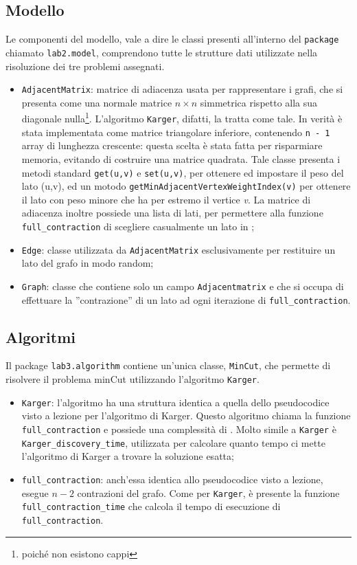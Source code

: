 \subsection{Modello}
Le componenti del modello, vale a dire le classi presenti all'interno del \texttt{package} chiamato \texttt{lab2.model}, comprendono tutte le strutture dati utilizzate nella risoluzione dei tre problemi assegnati. 
\begin{itemize}
	\item \label{adjmat}\texttt{AdjacentMatrix}: matrice di adiacenza usata per rappresentare i grafi, che si presenta come una normale matrice $n\times n$ simmetrica rispetto alla sua diagonale nulla\footnote{poiché non esistono cappi}. L'algoritmo \texttt{Karger}, difatti, la tratta come tale. In verità è stata implementata come matrice triangolare inferiore, contenendo \texttt{n - 1} array di lunghezza crescente: questa scelta è stata fatta per risparmiare memoria, evitando di costruire una matrice quadrata. Tale classe presenta i metodi standard \texttt{get(u,v)} e \texttt{set(u,v)}, per ottenere ed impostare il peso del lato (u,v), ed un motodo \texttt{getMinAdjacentVertexWeightIndex(v)} per ottenere il lato con peso minore che ha per estremo il vertice \textit{v}. La matrice di adiacenza inoltre possiede una lista di lati, per permettere alla funzione \texttt{full\_contraction} di scegliere casualmente un lato in ;
	\item \texttt{Edge}: classe utilizzata da \texttt{AdjacentMatrix} esclusivamente per restituire un lato del grafo in modo random;
	\item \texttt{Graph}: classe che contiene solo un campo \texttt{Adjacentmatrix} e che si occupa di effettuare la ''contrazione'' di un lato ad ogni iterazione di \texttt{full\_contraction}.
\end{itemize} 

\subsection{Algoritmi}
Il package \texttt{lab3.algorithm} contiene un'unica classe, \texttt{MinCut}, che permette di risolvere il problema minCut utilizzando l'algoritmo \texttt{Karger}.
\begin{itemize}
	\item \texttt{Karger}: l'algoritmo ha una struttura identica a quella dello pseudocodice visto a lezione per l'algoritmo di Karger. Questo algoritmo chiama la funzione \texttt{full\_contraction} e possiede una complessità di . Molto simile a \texttt{Karger} è \texttt{Karger\_discovery\_time}, utilizzata per calcolare quanto tempo ci mette l'algoritmo di Karger a trovare la soluzione esatta;
	\item \texttt{full\_contraction}: anch'essa identica allo pseudocodice visto a lezione, esegue $n-2$ contrazioni del grafo. Come per \texttt{Karger}, è presente la funzione \texttt{full\_contraction\_time} che calcola il tempo di esecuzione di \texttt{full\_contraction}.
\end{itemize}

